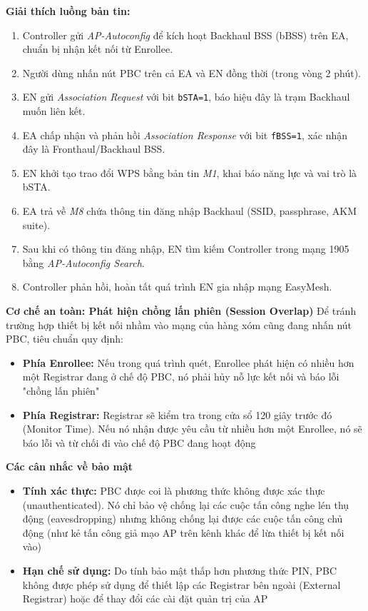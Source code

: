 \textbf{Giải thích luồng bản tin:}
\begin{enumerate}
	\item Controller gửi \textit{AP-Autoconfig} để kích hoạt Backhaul BSS (bBSS) trên EA,
	chuẩn bị nhận kết nối từ Enrollee.
	\item Người dùng nhấn nút PBC trên cả EA và EN đồng thời (trong vòng 2 phút).
	\item EN gửi \textit{Association Request} với bit \texttt{bSTA=1}, báo hiệu đây là
	trạm Backhaul muốn liên kết.
	\item EA chấp nhận và phản hồi \textit{Association Response} với bit \texttt{fBSS=1},
	xác nhận đây là Fronthaul/Backhaul BSS.
	\item EN khởi tạo trao đổi WPS bằng bản tin \textit{M1}, khai báo năng lực và
	vai trò là bSTA.
	\item EA trả về \textit{M8} chứa thông tin đăng nhập Backhaul (SSID, passphrase,
	AKM suite).
	\item Sau khi có thông tin đăng nhập, EN tìm kiếm Controller trong mạng 1905 bằng
	\textit{AP-Autoconfig Search}.
	\item Controller phản hồi, hoàn tất quá trình EN gia nhập mạng EasyMesh.
\end{enumerate}

\textbf{Cơ chế an toàn: Phát hiện chồng lấn phiên (Session Overlap)}
Để tránh trường hợp thiết bị kết nối nhầm vào mạng của hàng xóm cũng đang nhấn nút PBC, tiêu chuẩn quy định:
\begin{itemize}
	\item \textbf{Phía Enrollee: } Nếu trong quá trình quét, Enrollee phát hiện có nhiều hơn một Registrar đang ở chế độ PBC, nó phải hủy nỗ lực kết nối và báo lỗi "chồng lấn phiên"
	\item \textbf{Phía Registrar:} Registrar sẽ kiểm tra trong cửa sổ 120 giây trước đó (Monitor Time). Nếu nó nhận được yêu cầu từ nhiều hơn một Enrollee, nó sẽ báo lỗi và từ chối đi vào chế độ PBC đang hoạt động
\end{itemize}

\textbf{Các cân nhắc về bảo mật}
\begin{itemize}
	\item \textbf{Tính xác thực: } PBC được coi là phương thức không được xác thực (unauthenticated). Nó chỉ bảo vệ chống lại các cuộc tấn công nghe lén thụ động (eavesdropping) nhưng không chống lại được các cuộc tấn công chủ động (như kẻ tấn công giả mạo AP trên kênh khác để lừa thiết bị kết nối vào)
	\item \textbf{Hạn chế sử dụng:} Do tính bảo mật thấp hơn phương thức PIN, PBC không được phép sử dụng để thiết lập các Registrar bên ngoài (External Registrar) hoặc để thay đổi các cài đặt quản trị của AP
\end{itemize}

